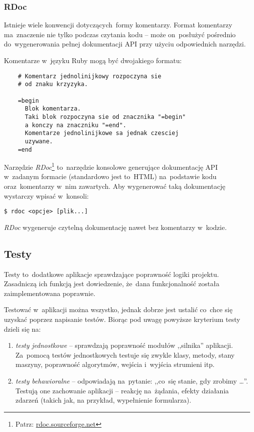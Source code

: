 \subsubsection{RDoc} \label{dokumentacja.rdoc}

Istnieje wiele konwencji dotyczących~formy komentarzy. Format komentarzy ma~znaczenie nie tylko podczas czytania kodu -- może on~posłużyć pośrednio do~wygenerowania pełnej dokumentacji API przy użyciu odpowiednich narzędzi.


Komentarze w~języku Ruby mogą być dwojakiego formatu:

  \begin{lstlisting}
    # Komentarz jednolinijkowy rozpoczyna sie
    # od znaku krzyzyka.

    =begin
      Blok komentarza.
      Taki blok rozpoczyna sie od znacznika "=begin"
      a konczy na znaczniku "=end".
      Komentarze jednolinijkowe sa jednak czesciej
      uzywane.
    =end
  \end{lstlisting}


Narzędzie \textit{RDoc}\footnote{Patrz: \url{rdoc.sourceforge.net}} to~narzędzie konsolowe generujące dokumentację API w~zadanym formacie (standardowo jest to~HTML) na~podstawie kodu oraz~komentarzy w~nim zawartych. Aby wygenerować taką dokumentację wystarczy wpisać w~konsoli:

\mbox{\texttt{\$ rdoc <opcje> [plik...] }}

\textit{RDoc} wygeneruje czytelną dokumentację nawet bez komentarzy w~kodzie.

\subsection{Testy} \label{dokumentacja.testy}

Testy to~dodatkowe aplikacje sprawdzające poprawność logiki projektu. Zasadniczą ich funkcją jest dowiedzenie, że~dana funkcjonalność została zaimplementowana poprawnie.


Testować w~aplikacji można wszystko, jednak dobrze jest ustalić co~chce się uzyskać poprzez napisanie testów. Biorąc pod uwagę powyższe kryterium testy dzieli się na:

\begin{enumerate}
 \item \textit{testy jednostkowe} -- sprawdzają poprawność modułów ,,silnika'' aplikacji. Za~pomocą testów jednostkowych testuje się zwykle klasy, metody, stany maszyny, poprawność algorytmów, wejścia i~wyjścia strumieni itp.
 \item \textit{testy behawioralne} -- odpowiadają na~pytanie: ,,co~się stanie, gdy zrobimy \ldots''. Testują one zachowanie aplikacji -- reakcję na~żądania, efekty działania zdarzeń (takich jak, na przykład, wypełnienie formularza).
\end{enumerate}

